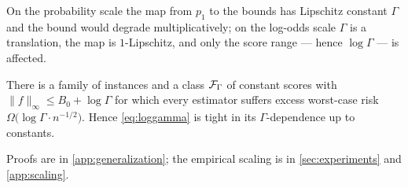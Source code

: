 On the probability scale the map from $p_1$ to the bounds has Lipschitz
constant $\Gamma$ and the bound would degrade multiplicatively; on the log-odds
scale $\Gamma$ is a translation, the map is $1$-Lipschitz, and only the score
range --- hence $\log\Gamma$ --- is affected.

\begin{proposition}
\label{prop:lower-gen}
There is a family of instances and a class $\mathcal{F}_\Gamma$ of constant scores with
$\|f\|_\infty\le B_0+\log\Gamma$ for which every estimator suffers excess
worst-case risk $\Omega\big(\log\Gamma\cdot n^{-1/2}\big)$. Hence
\eqref{eq:loggamma} is tight in its $\Gamma$-dependence up to constants.
\end{proposition}

Proofs are in \cref{app:generalization}; the empirical scaling is in
\cref{sec:experiments} and \cref{app:scaling}.

